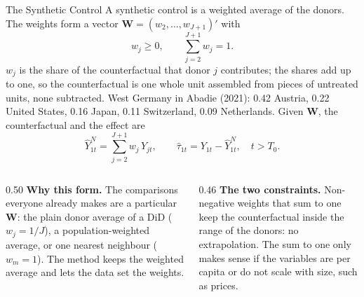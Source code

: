\documentclass[main.tex]{subfiles}
\begin{document}
\begin{frame}{The Synthetic Control}
  \small
  A synthetic control is a weighted average of the donors. The weights form a
  vector $\mathbf{W} = (w_2, \dots, w_{J+1})'$ with
  \[
    w_j \ge 0, \qquad \sum_{j=2}^{J+1} w_j = 1 .
  \]
  $w_j$ is the share of the counterfactual that donor $j$ contributes; the
  shares add up to one, so the counterfactual is one whole unit assembled from
  pieces of untreated units, none subtracted. West Germany in Abadie (2021):
  0.42 Austria, 0.22 United States, 0.16 Japan, 0.11 Switzerland, 0.09
  Netherlands. Given $\mathbf{W}$, the counterfactual and the effect are
  \[
    \hat Y^{N}_{1t} = \sum_{j=2}^{J+1} w_j\, Y_{jt}, \qquad
    \hat\tau_{1t} = Y_{1t} - \hat Y^{N}_{1t}, \quad t > T_0 .
  \]
  \begin{columns}[T]
    \begin{column}{0.50\textwidth}
      \footnotesize
      \textbf{Why this form.} The comparisons everyone already makes are a
      particular $\mathbf{W}$: the plain donor average of a DiD ($w_j = 1/J$),
      a population-weighted average, or one nearest neighbour ($w_m = 1$).
      The method keeps the weighted average and lets the data set
      the weights.
    \end{column}
    \begin{column}{0.46\textwidth}
      \footnotesize
      \textbf{The two constraints.} Non-negative weights that sum to one keep
      the counterfactual inside the range of the donors: no extrapolation.
      The sum to one only makes sense if the variables are per capita
      or do not scale with size, such as prices.
    \end{column}
  \end{columns}
\end{frame}
\end{document}
